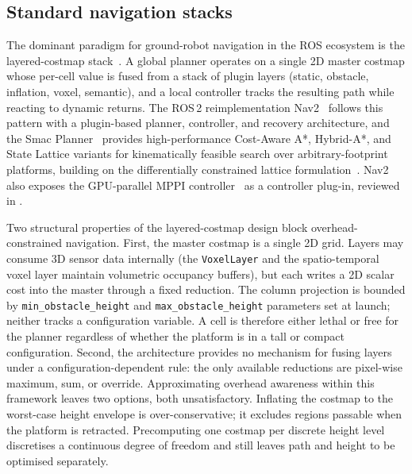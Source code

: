\documentclass[11pt,a4paper]{article}
\begin{document}
\subsection{Standard navigation stacks}
\label{sec:sq4:navstacks}

The dominant paradigm for ground-robot navigation in the ROS ecosystem is the layered-costmap stack~\parencite{luLayeredCostmapsContextsensitive2014}. A global planner operates on a single 2D master costmap whose per-cell value is fused from a stack of plugin layers (static, obstacle, inflation, voxel, semantic), and a local controller tracks the resulting path while reacting to dynamic returns. The ROS\,2 reimplementation Nav2~\parencite{macenski2020nav2} follows this pattern with a plugin-based planner, controller, and recovery architecture, and the Smac Planner~\parencite{macenskiOpenSourceCostAwareKinematically2025} provides high-performance Cost-Aware A*, Hybrid-A*, and State Lattice variants for kinematically feasible search over arbitrary-footprint platforms, building on the differentially constrained lattice formulation~\parencite{pivtoraikoDifferentiallyConstrainedMobile2009}. Nav2 also exposes the GPU-parallel MPPI controller~\parencite{williamsAggressiveDrivingModel2016} as a controller plug-in, reviewed in .

Two structural properties of the layered-costmap design block overhead-constrained navigation. First, the master costmap is a single 2D grid. Layers may consume 3D sensor data internally (the \texttt{VoxelLayer} and the spatio-temporal voxel layer maintain volumetric occupancy buffers), but each writes a 2D scalar cost into the master through a fixed reduction. The column projection is bounded by \texttt{min\_obstacle\_height} and \texttt{max\_obstacle\_height} parameters set at launch; neither tracks a configuration variable. A cell is therefore either lethal or free for the planner regardless of whether the platform is in a tall or compact configuration. Second, the architecture provides no mechanism for fusing layers under a configuration-dependent rule: the only available reductions are pixel-wise maximum, sum, or override. Approximating overhead awareness within this framework leaves two options, both unsatisfactory. Inflating the costmap to the worst-case height envelope is over-conservative; it excludes regions passable when the platform is retracted. Precomputing one costmap per discrete height level discretises a continuous degree of freedom and still leaves path and height to be optimised separately.
\end{document}
